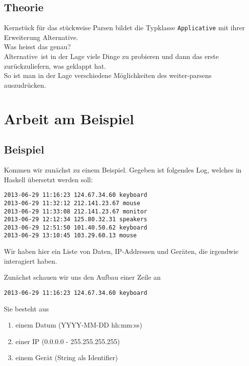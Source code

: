 \documentclass{beamer}
\begin{document}
\subsection{Theorie}
\begin{frame}[fragile]
Kernstück für das stückweise Parsen bildet die Typklasse \texttt{Applicative} mit ihrer Erweiterung \glqq Alternative\grqq .\\
\pause
\bigskip
Was heisst das genau?\\
\bigskip
\pause
\glqq Alternative\grqq \  ist in der Lage viele Dinge zu probieren und dann das erste zurückzuliefern, was geklappt hat.\\
So ist man in der Lage verschiedene Möglichkeiten des weiter-parsens auszudrücken.
\end{frame}

\section{Arbeit am Beispiel}
\subsection{Beispiel}
\begin{frame}[fragile]
Kommen wir zunächst zu einem Beispiel. Gegeben ist folgendes Log, welches in Haskell übersetzt werden soll:
\small
\begin{verbatim}
2013-06-29 11:16:23 124.67.34.60 keyboard
2013-06-29 11:32:12 212.141.23.67 mouse
2013-06-29 11:33:08 212.141.23.67 monitor
2013-06-29 12:12:34 125.80.32.31 speakers
2013-06-29 12:51:50 101.40.50.62 keyboard
2013-06-29 13:10:45 103.29.60.13 mouse
\end{verbatim}
\normalsize
Wir haben hier ein Liste von Daten, IP-Addressen und Geräten, die irgendwie interagiert haben.
\end{frame}

\begin{frame}[fragile]
Zunächst schauen wir uns den Aufbau einer Zeile an
\begin{verbatim}
2013-06-29 11:16:23 124.67.34.60 keyboard
\end{verbatim}
\pause
Sie besteht aus
\begin{enumerate}
 \item einem Datum (YYYY-MM-DD hh:mm:ss)
 \item einer IP (0.0.0.0 - 255.255.255.255)
 \item einem Gerät (String als Identifier)
\end{enumerate}
\end{frame}
\end{document}
